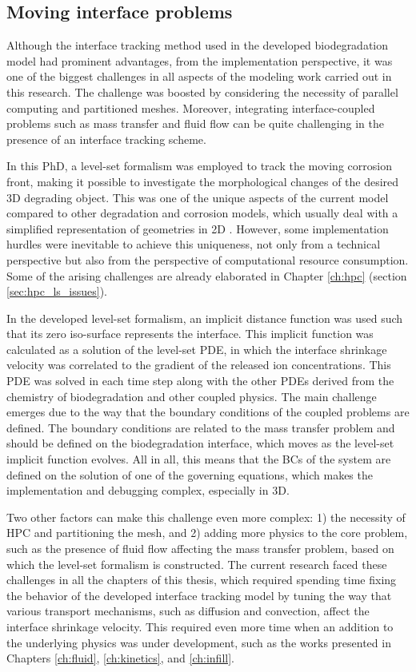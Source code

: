 \subsection{Moving interface problems}

Although the interface tracking method used in the developed biodegradation model had prominent advantages, from the implementation perspective, it was one of the biggest challenges in all aspects of the modeling work carried out in this research. The challenge was boosted by considering the necessity of parallel computing and partitioned meshes. Moreover, integrating interface-coupled problems such as mass transfer and fluid flow can be quite challenging in the presence of an interface tracking scheme.

In this PhD, a level-set formalism was employed to track the moving corrosion front, making it possible to investigate the morphological changes of the desired 3D degrading object. This was one of the unique aspects of the current model compared to other degradation and corrosion models, which usually deal with a simplified representation of geometries in 2D \cite{Albaraghtheh2022}. However, some implementation hurdles were inevitable to achieve this uniqueness, not only from a technical perspective but also from the perspective of computational resource consumption. Some of the arising challenges are already elaborated in Chapter \ref{ch:hpc} (section \ref{sec:hpc_ls_issues}).

In the developed level-set formalism, an implicit distance function was used such that its zero iso-surface represents the interface. This implicit function was calculated as a solution of the level-set \gls{PDE}, in which the interface shrinkage velocity was correlated to the gradient of the released ion concentrations. This \gls{PDE} was solved in each time step along with the other \gls{PDE}s derived from the chemistry of biodegradation and other coupled physics. The main challenge emerges due to the way that the boundary conditions of the coupled problems are defined. The boundary conditions are related to the mass transfer problem and should be defined on the biodegradation interface, which moves as the level-set implicit function evolves. All in all, this means that the BCs of the system are defined on the solution of one of the governing equations, which makes the implementation and debugging complex, especially in 3D.

Two other factors can make this challenge even more complex: 1) the necessity of \gls{HPC} and partitioning the mesh, and 2) adding more physics to the core problem, such as the presence of fluid flow affecting the mass transfer problem, based on which the level-set formalism is constructed. The current research faced these challenges in all the chapters of this thesis, which required spending time fixing the behavior of the developed interface tracking model by tuning the way that various transport mechanisms, such as diffusion and convection, affect the interface shrinkage velocity. This required even more time when an addition to the underlying physics was under development, such as the works presented in Chapters \ref{ch:fluid}, \ref{ch:kinetics}, and \ref{ch:infill}.


